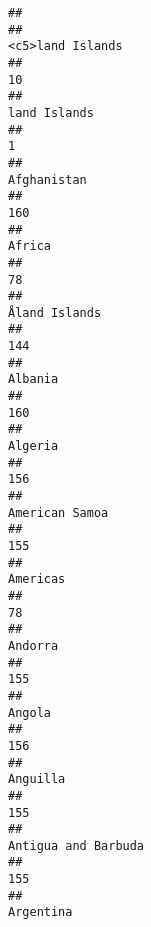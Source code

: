 \documentclass[]{article}
\begin{document}
\begin{verbatim}
## 
##                                                                             <c5>land Islands 
##                                                                                           10 
##                                                                                land Islands 
##                                                                                            1 
##                                                                                  Afghanistan 
##                                                                                          160 
##                                                                                       Africa 
##                                                                                           78 
##                                                                                Åland Islands 
##                                                                                          144 
##                                                                                      Albania 
##                                                                                          160 
##                                                                                      Algeria 
##                                                                                          156 
##                                                                               American Samoa 
##                                                                                          155 
##                                                                                     Americas 
##                                                                                           78 
##                                                                                      Andorra 
##                                                                                          155 
##                                                                                       Angola 
##                                                                                          156 
##                                                                                     Anguilla 
##                                                                                          155 
##                                                                          Antigua and Barbuda 
##                                                                                          155 
##                                                                                    Argentina 

\end{verbatim}
\end{document}
